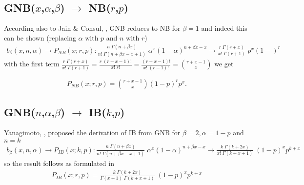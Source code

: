 \subsection{GNB($x$,$\alpha$,$\beta$) $\rightarrow$ NB($r$,$p$)}
According also to Jain \& Consul, \cite{jain1971generalized}, GNB reduces to NB for $\beta = 1$ and 
indeed this can be shown (replacing $\alpha$ with $p$ and $n$ with $r$)
\begin{align*}
 b_{\beta}(x,n,\alpha) \rightarrow P_{NB}(x;r,p):
 \frac{n \; \Gamma(n+\beta x)}{n! \;\Gamma(n + \beta x - x +1)}  \; \alpha^x (1-\alpha)^{n+\beta x-x} \rightarrow 
\frac{r \; \Gamma(r + x)}{x! \;\Gamma(r + 1)}  \; p^x (1-)^{r} 
\end{align*}
with the first term $\frac{r \; \Gamma(r + x)}{x! \;\Gamma(r + 1)} = \frac{r \; (r + x - 1)!}{x! \;r!} = \frac{(r + x - 1)!}{x! \;(r-1)!}
= {r + x - 1 \choose x}$ we get

\begin{align*}
P_{NB}(x;r,p) = {r + x - 1 \choose x} (1-p)^r p^x .
\end{align*}


\subsection{GNB($n$,$\alpha$,$\beta$) $\rightarrow$ IB($k$,$p$)}
Yanagimoto, \cite{yanagimoto1989inverse}, proposed the derivation 
of IB from GNB for $\beta = 2, \alpha=1-p$ and $n=k$
\begin{align*}
b_{\beta}(x,n,\alpha) \rightarrow P_{IB}(x;k,p):
 \frac{n \; \Gamma(n+\beta x)}{n! \;\Gamma(n + \beta x - x +1)}  \; \alpha^x (1-\alpha)^{n+\beta x-x} \rightarrow 
\frac{k \; \Gamma(k + 2x)}{x! \;\Gamma(k + x + 1)}  \; (1-p)^x p^{k+x} 
\end{align*}
so the result follows as formulated in \cite{yanagimoto1989inverse}
\begin{align*}
P_{IB}(x;r,p) = \frac{k \; \Gamma(k + 2x)}{\Gamma(x+1) \;\Gamma(k + x + 1)}  \; (1-p)^x p^{k+x} 
\end{align*}


%
%
%




